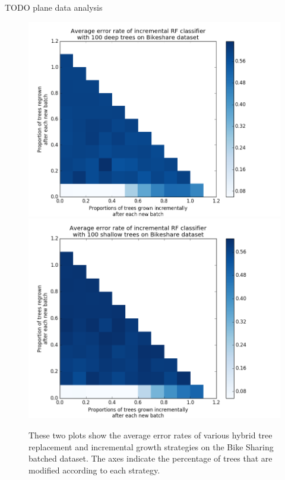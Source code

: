 TODO plane data analysis


\begin{figure}
  \centering
  \includegraphics[width=5in]{bikesharedeep}
  \includegraphics[width=5in]{bikeshareshallow}
  \caption{These two plots show the average error rates of various hybrid tree
  replacement and incremental growth strategies on the Bike Sharing batched
dataset. The axes indicate the percentage of trees that are modified according
to each strategy.}
  \label{fig:bikesharehybrid}
\end{figure}
 


